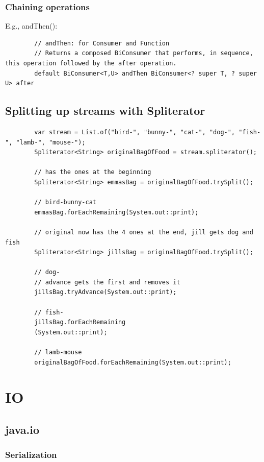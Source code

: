 \documentclass{scrartcl}
\begin{document}
\subsubsection{Chaining operations}

    E.g., andThen():

    \begin{lstlisting}
        // andThen: for Consumer and Function
        // Returns a composed BiConsumer that performs, in sequence, this operation followed by the after operation.
        default BiConsumer<T,U> andThen BiConsumer<? super T, ? super U> after
    \end{lstlisting}

\subsection{Splitting up streams with Spliterator}

    \begin{lstlisting}
        var stream = List.of("bird-", "bunny-", "cat-", "dog-", "fish-", "lamb-", "mouse-");
        Spliterator<String> originalBagOfFood = stream.spliterator();

        // has the ones at the beginning
        Spliterator<String> emmasBag = originalBagOfFood.trySplit();

        // bird-bunny-cat
        emmasBag.forEachRemaining(System.out::print);

        // original now has the 4 ones at the end, jill gets dog and fish
        Spliterator<String> jillsBag = originalBagOfFood.trySplit();

        // dog-
        // advance gets the first and removes it
        jillsBag.tryAdvance(System.out::print);

        // fish-
        jillsBag.forEachRemaining
        (System.out::print);

        // lamb-mouse
        originalBagOfFood.forEachRemaining(System.out::print);
    \end{lstlisting}

\section{IO}
\subsection{java.io}
\subsubsection{Serialization}
\end{document}
